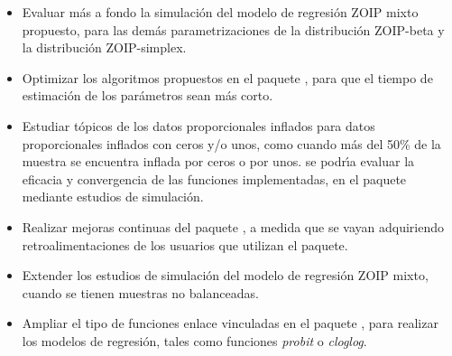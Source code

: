 \begin{itemize}
	\item Evaluar m\'{a}s a fondo la simulaci\'{o}n del modelo de regresi\'{o}n ZOIP mixto propuesto, para las dem\'{a}s parametrizaciones de la distribuci\'{o}n ZOIP-beta y la distribuci\'{o}n ZOIP-simplex.
	\item Optimizar los algoritmos propuestos en el paquete , para que el tiempo de estimaci\'{o}n de los par\'{a}metros sean m\'{a}s corto.
	\item Estudiar t\'{o}picos de los datos proporcionales inflados para datos proporcionales inflados con ceros y/o unos, como cuando m\'{a}s del 50\% de la muestra se encuentra inflada por ceros o por unos. se podr\'{\i}a evaluar la eficacia y convergencia de las funciones implementadas, en el paquete  mediante estudios de simulaci\'{o}n.
	\item Realizar mejoras continuas del paquete , a medida que se vayan adquiriendo retroalimentaciones de los usuarios que utilizan el paquete.
	\item Extender los estudios de simulaci\'{o}n del modelo de regresi\'{o}n ZOIP mixto, cuando se tienen muestras no balanceadas.
\item Ampliar el tipo de funciones enlace vinculadas en el paquete , para realizar los modelos de regresi\'{o}n, tales como funciones \textsl{probit} o \textsl{cloglog}.

\end{itemize}

